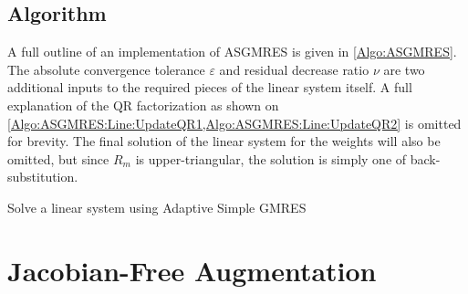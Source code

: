 \documentclass[12pt]{UWMadThesis}
\begin{document}
\subsection{Algorithm}

A full outline of an implementation of ASGMRES is given in \cref{Algo:ASGMRES}.
The absolute convergence tolerance $\varepsilon$ and residual decrease ratio $\nu$ are two additional inputs to the required pieces of the linear system itself.
A full explanation of the QR factorization as shown on \cref{Algo:ASGMRES:Line:UpdateQR1,Algo:ASGMRES:Line:UpdateQR2} is omitted for brevity.
The final solution of the linear system for the weights will also be omitted, but since $R_m$ is upper-triangular, the solution is simply one of back-substitution.

\begin{algorithm}[t]
    \caption{Solve a linear system using Adaptive Simple GMRES}
    \label{Algo:ASGMRES}
\end{algorithm}



\clearpage
\section{Jacobian-Free Augmentation}
\end{document}
